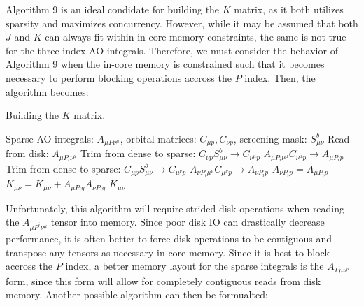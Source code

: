 Algorithm 9 is an ideal condidate for building the $K$ matrix, as it both utilizes sparsity and maximizes concurrency.
However, while it may be assumed that both $J$ and $K$ can always fit within in-core memory constraints, the same is not true 
for the three-index AO integrals.  Therefore, we must consider the behavior of Algorithm 9 when the 
in-core memory is constrained such that it becomes necessary to perform blocking operations accross the $P$ index. Then, the algorithm
becomes: 

\begin{algorithm}[H]
\caption{Building the $K$ matrix.}
\begin{algorithmic}
\REQUIRE Sparse AO integrals: $A_{\mu P \nu^\mu}$, orbital matrices: $C_{\mu p}, C_{\nu p}$, screening mask: $S_{\mu \nu}^b$
    \STATE Read from disk: $A_{\mu P_i \nu^{\mu}}$
        \STATE Trim from dense to sparse: $C_{\nu p}S_{\mu \nu}^b \rightarrow C_{\nu^{\mu} p}$
        \STATE $A_{\mu P_i \nu^{\mu}} C_{\nu^{\mu} p} \rightarrow A_{\mu P_i p}$
            \STATE Trim from dense to sparse: $C_{\mu p}S_{\mu \nu}^b \rightarrow C_{\mu^{\nu} p}$
            \STATE $A_{\nu P_i \mu^{\nu}} C_{\mu^{\nu} p} \rightarrow A_{\nu P_i p}$
        \ELSE
            \STATE $A_{\nu P_i p} = A_{\mu P_i p}$ 
        \ENDIF
    \ENDFOR
    \STATE $K_{\mu \nu} = K_{\mu \nu} + A_{\mu P_i q} A_{\nu P_i q}$
\ENDFOR
\RETURN $K_{\mu \nu}$
\end{algorithmic}
\end{algorithm}

\noindent Unfortunately, this algorithm will require strided disk operations when reading the $A_{\mu P^i \nu^{\mu}}$ tensor into memory.
Since poor disk IO can drastically decrease performance, it is often better to force disk operations 
to be contiguous and transpose any tensors as necessary in core memory. Since it is best to block accross the $P$ index, a better
memory layout for the sparse integrals is the $A_{P \mu \nu^\mu}$ form, since this form will allow for completely 
contiguous reads from disk memory. Another possible algorithm can then be formualted:

